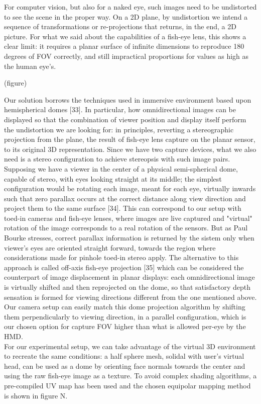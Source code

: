 For computer vision, but also for a naked eye, such images need to be undistorted to see the scene in the proper way. On a 2D plane, by undistortion we intend a sequence of transformations or re-projections that returns, in the end, a 2D picture. For what we said about the capabilities of a fish-eye lens, this shows a clear limit: it requires a planar surface of infinite dimensions to reproduce 180 degrees of FOV correctly, and still impractical proportions for values as high as the human eye's.

(figure)

Our solution borrows the techniques used in immersive environment based upon hemispherical domes [33]. In particular, how omnidirectional images can be displayed so that the combination of viewer position and display itself perform the undistortion we are looking for: in principles, reverting a stereographic projection from the plane, the result of fish-eye lens capture on the planar sensor, to its original 3D representation. Since we have two capture devices, what we also need is a stereo configuration to achieve stereopsis with such image pairs. Supposing we have a viewer in the center of a physical semi-spherical dome, capable of stereo, with eyes looking straight at its middle; the simplest configuration would be rotating each image, meant for each eye,  virtually inwards such that zero parallax occurs at the correct distance along view direction and project them to the same surface [34]. This can correspond to our setup with toed-in cameras and fish-eye lenses, where images are live captured and "virtual" rotation of the image corresponds to a real rotation of the sensors. But as Paul Bourke stresses, correct parallax information is returned by the sistem only when viewer's eyes are oriented straight forward, towards the region where considerations made for pinhole toed-in stereo apply. The alternative to this approach is called off-axis fish-eye projection [35] which can be considered the counterpart of image displacement in planar displays: each omnidirectional image is virtually shifted and then reprojected on the dome, so that satisfactory depth sensation is formed for viewing directions different from the one mentioned above. Our camera setup can easily match this dome projection algorithm by shifting them perpendicularly to viewing direction, in a parallel configuration, which is our chosen option for capture FOV higher than what is allowed per-eye by the HMD.\\
For our experimental setup, we can take advantage of the virtual 3D environment to recreate the same conditions: a half sphere mesh, solidal with user's virtual head,  can be used as a dome by orienting face normals towards the center and using the raw fish-eye image as a texture. To avoid complex shading algorithms, a pre-compiled UV map has been used and the chosen equipolar mapping method is shown in figure N.\\
